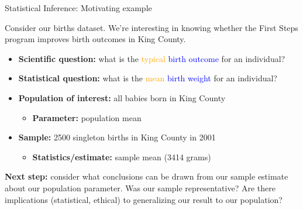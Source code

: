 \documentclass[10pt,t]{beamer}
\begin{document}
\begin{frame}{Statistical Inference: Motivating example}

Consider our births dataset. We're interesting in knowing whether the First Steps program improves birth outcomes in King County.

\vspace{0.1cm}

\begin{itemize}
	\item \textbf{Scientific question:} what is the \textcolor{orange}{typical}  \textcolor{blue}{birth outcome} for an individual?
	\item \textbf{Statistical question:} what is the \textcolor{orange}{mean} \textcolor{blue}{birth weight} for an individual?
	\item \textbf{Population of interest:} all babies born in King County
	\begin{itemize}
		\item \textbf{Parameter:} population mean
	\end{itemize}
	\item \textbf{Sample:} 2500 singleton births in King County in 2001
	\begin{itemize}
		\item \textbf{Statistics/estimate:} sample mean (3414 grams)
	\end{itemize}
\end{itemize}

\vspace{0.1cm}

\small \textbf{Next step:} consider what conclusions can be drawn from our sample estimate about our population parameter. Was our sample representative? Are there implications (statistical, ethical) to generalizing our result to our population?

\end{frame}
\end{document}
